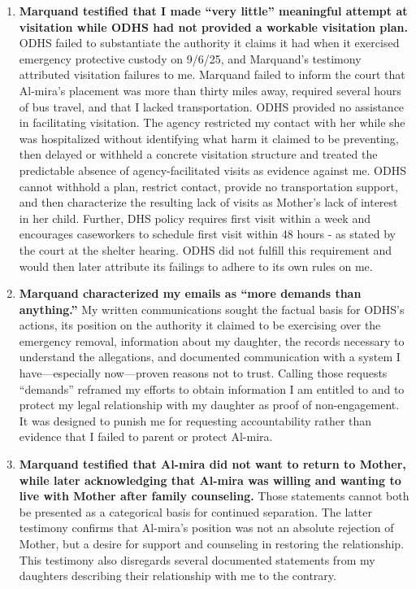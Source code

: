 \documentclass[10pt,a4paper,roman]{moderncv}
\begin{document}
\begin{enumerate}[label=\arabic*., leftmargin=0.5in, itemsep=0.85em]
		\item \textbf{Marquand testified that I made ``very little'' meaningful attempt at visitation while ODHS had not provided a workable visitation plan.} ODHS failed to substantiate the authority it claims it had when it exercised emergency protective custody on 9/6/25, and Marquand's testimony attributed visitation failures to me. Marquand failed to inform the court that Al-mira's placement was more than thirty miles away, required several hours of bus travel, and that I lacked transportation. ODHS provided no assistance in facilitating visitation. The agency restricted my contact with her while she was hospitalized without identifying what harm it claimed to be preventing, then delayed or withheld a concrete visitation structure and treated the predictable absence of agency-facilitated visits as evidence against me. ODHS cannot withhold a plan, restrict contact, provide no transportation support, and then characterize the resulting lack of visits as Mother's lack of interest in her child. Further, DHS policy requires first visit within a week and encourages caseworkers to schedule first visit within 48 hours - as stated by the court at the shelter hearing. ODHS did not fulfill this requirement and would then later attribute its failings to adhere to its own rules on me. 
		
		\item \textbf{Marquand characterized my emails as ``more demands than anything.''} My written communications sought the factual basis for ODHS's actions, its position on the authority it claimed to be exercising over the emergency removal, information about my daughter, the records necessary to understand the allegations, and documented communication with a system I have---especially now---proven reasons not to trust. Calling those requests ``demands'' reframed my efforts to obtain information I am entitled to and to protect my legal relationship with my daughter as proof of non-engagement. It was designed to punish me for requesting accountability rather than evidence that I failed to parent or protect Al-mira.
		
		\item \textbf{Marquand testified that Al-mira did not want to return to Mother, while later acknowledging that Al-mira was willing and wanting to live with Mother after family counseling.} Those statements cannot both be presented as a categorical basis for continued separation. The latter testimony confirms that Al-mira's position was not an absolute rejection of Mother, but a desire for support and counseling in restoring the relationship. This testimony also disregards several documented statements from my daughters describing their relationship with me to the contrary.
		
	\end{enumerate}
	
\end{document}
